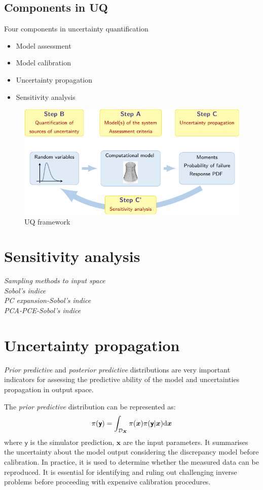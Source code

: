 \documentclass{ol-softwaremanual}
\begin{document}
\subsection*{Components in UQ}
Four components in uncertainty quantification
\begin{itemize}
    \item Model assessment
    \item Model calibration
    \item Uncertainty propagation
    \item Sensitivity analysis
\end{itemize}
\begin{figure}[htbp]
    \centering
    \includegraphics{figures/figure-UQ_components_bruno.pdf}
    \caption{UQ framework}
    \label{fig:UQ_framework}
\end{figure}




\section{Sensitivity analysis}
\textit{Sampling methods to input space}\\
\textit{Sobol's indice}\\
\textit{PC expansion-Sobol's indice}\\
\textit{PCA-PCE-Sobol's indice} 


\section{Uncertainty propagation}
\textit{Prior predictive} and \textit{posterior predictive} distributions are very important indicators for assessing the predictive ability of the model and uncertainties propagation in output space.

The \textit{prior predictive} distribution can be represented as:
\begin{equation}
    \label{eq: prior predictive}
    \pi({\boldsymbol{\mathsf{y}}}) = \int_{\mathcal{D}_{\boldsymbol{X}}} 
    \pi(\boldsymbol{x}) \pi({\boldsymbol{\mathsf{y}}}|\boldsymbol{x}) {\rm{d}} \boldsymbol{x}
\end{equation}
where ${\boldsymbol{\mathsf{y}}}$ is the simulator prediction, $\boldsymbol{x}$ are the input parameters. It summarises the uncertainty about the model output considering the discrepancy model before calibration. In practice, it is used to determine whether the measured data can be reproduced. It is essential for identifying and ruling out challenging inverse problems before proceeding with expensive calibration procedures. 
\end{document}
